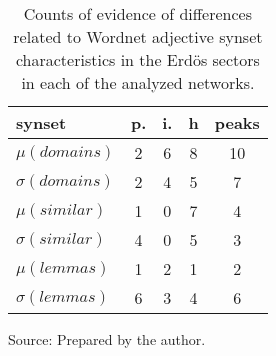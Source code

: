 \begin{table}[h!]
\begin{center}
\caption{Counts of evidence of differences related to Wordnet adjective synset characteristics in the Erd\"os sectors in each of the analyzed networks.}
\begin{tabular}{| l || c | c | c || c |}\hline
{\bf synset} & {\bf p.} & {\bf i.} & {\bf h} & {\bf peaks} \\\hline\hline
$\mu(domains)$ & 2  & 6  & 8  & 10 \\
$\sigma(domains)$ & 2  & 4  & 5  & 7 \\\hline
$\mu(similar)$ & 1  & 0  & 7  & 4 \\
$\sigma(similar)$ & 4  & 0  & 5  & 3 \\\hline
$\mu(lemmas)$ & 1  & 2  & 1  & 2 \\
$\sigma(lemmas)$ & 6  & 3  & 4  & 6 \\\hline
\end{tabular}
\begin{flushleft}
		Source: Prepared by the author.\
\end{flushleft}
\end{center}
\end{table}
